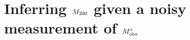 \documentclass[useAMS,usenatbib]{mn2e}
\begin{document}

\appendix


\section{Inferring $M_{200}$ given a noisy measurement of $M^{*}_{\rm obs}$}
\label{appendix:MSMH}





% 

% 
% 




\label{lastpage}
\bsp
\end{document}
